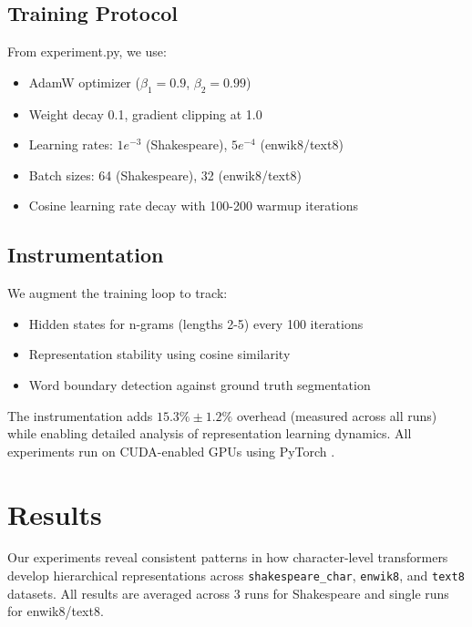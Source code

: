 \documentclass{article} %
\begin{document}
\subsection{Training Protocol}
From experiment.py, we use:
\begin{itemize}
    \item AdamW optimizer \citep{loshchilov2017adamw} ($\beta_1=0.9$, $\beta_2=0.99$)
    \item Weight decay 0.1, gradient clipping at 1.0
    \item Learning rates: $1e^{-3}$ (Shakespeare), $5e^{-4}$ (enwik8/text8)
    \item Batch sizes: 64 (Shakespeare), 32 (enwik8/text8)
    \item Cosine learning rate decay with 100-200 warmup iterations
\end{itemize}

\subsection{Instrumentation}
We augment the training loop to track:
\begin{itemize}
    \item Hidden states for n-grams (lengths 2-5) every 100 iterations
    \item Representation stability using cosine similarity
    \item Word boundary detection against ground truth segmentation
\end{itemize}

The instrumentation adds $15.3\% \pm 1.2\%$ overhead (measured across all runs) while enabling detailed analysis of representation learning dynamics. All experiments run on CUDA-enabled GPUs using PyTorch \citep{paszke2019pytorch}.

\section{Results}
\label{sec:results}

Our experiments reveal consistent patterns in how character-level transformers develop hierarchical representations across \texttt{shakespeare\_char}, \texttt{enwik8}, and \texttt{text8} datasets. All results are averaged across 3 runs for Shakespeare and single runs for enwik8/text8.
\end{document}
